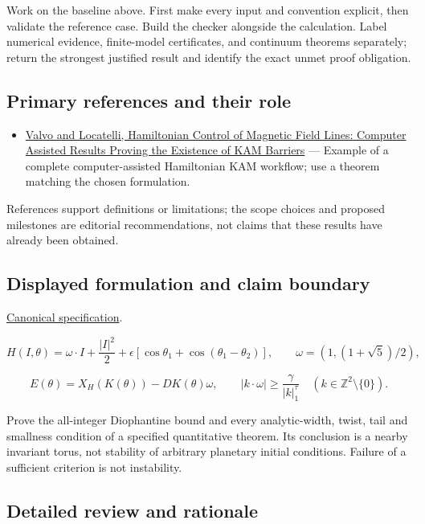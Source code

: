 \documentclass[
  11pt,
]{article}
\providecommand{\tightlist}{%
  \setlength{\itemsep}{0pt}\setlength{\parskip}{0pt}}
\begin{document}
Work on the baseline above. First make every input and convention
explicit, then validate the reference case. Build the checker alongside
the calculation. Label numerical evidence, finite-model certificates,
and continuum theorems separately; return the strongest justified result
and identify the exact unmet proof obligation.

\subsection{Primary references and their role}

\begin{itemize}
\tightlist
\item
  \href{https://arxiv.org/abs/2101.07785}{Valvo and Locatelli,
  Hamiltonian Control of Magnetic Field Lines: Computer Assisted Results
  Proving the Existence of KAM Barriers} --- Example of a complete
  computer-assisted Hamiltonian KAM workflow; use a theorem matching the
  chosen formulation.
\end{itemize}

References support definitions or limitations; the scope choices and
proposed milestones are editorial recommendations, not claims that these
results have already been obtained.

\subsection{Displayed formulation and claim boundary}

\href{https://github.com/rick-stevens-ai/Pure-Thought/blob/main/PRDs/26-KAM-Theory-Planetary-Stability.md}{Canonical
specification}.

\[H(I,\theta)=\omega\cdot I+\frac{|I|^2}{2}
+\epsilon[\cos\theta_1+\cos(\theta_1-\theta_2)],
\qquad\omega=(1,(1+\sqrt5)/2),\]

\[E(\theta)=X_H(K(\theta))-DK(\theta)\omega,
\qquad |k\cdot\omega|\ge\frac\gamma{|k|_1^\tau}
\quad(k\in\mathbb Z^2\setminus\{0\}).\]

Prove the all-integer Diophantine bound and every analytic-width, twist,
tail and smallness condition of a specified quantitative theorem. Its
conclusion is a nearby invariant torus, not stability of arbitrary
planetary initial conditions. Failure of a sufficient criterion is not
instability.

\subsection{Detailed review and rationale}
\end{document}

